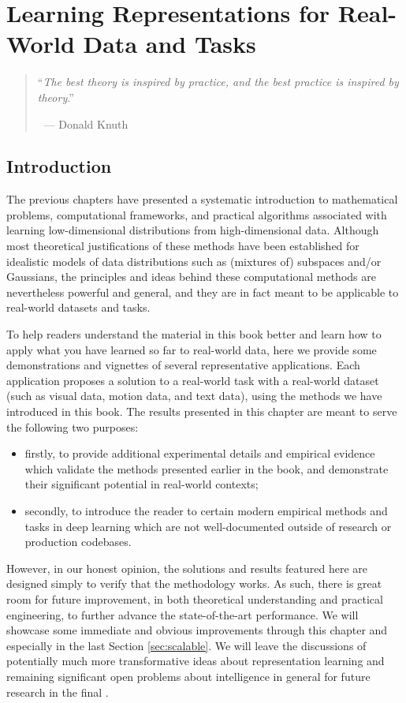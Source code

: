 \documentclass[../../book-main.tex]{subfiles}
\begin{document}
\chapter{Learning Representations for Real-World Data and Tasks}
\label{ch:applications}

\begin{quote}
    \hfill    ``{\em The best theory is inspired by practice, and the
    best practice is inspired by theory}.''

    $~$ \hfill --- Donald Knuth
\end{quote}
\vspace{5mm}

\section{Introduction}
The previous chapters have presented a systematic introduction to
mathematical problems, computational frameworks, and practical
algorithms associated with learning low-dimensional distributions
from high-dimensional data. Although most theoretical justifications
of these methods have been established for idealistic models of data
distributions such as (mixtures of) subspaces and/or Gaussians, the
principles and ideas behind these computational methods are
nevertheless powerful and general, and they are in fact meant to be
applicable to real-world datasets and tasks.

To help readers understand the material in this book better and learn
how to apply what you have learned so far to real-world data, here we
provide some demonstrations and vignettes of
several representative applications. Each application proposes a
solution to a real-world task with a real-world dataset (such as
visual data, motion data, and text data), using the methods we have
introduced in this book. The results presented in this chapter are
meant to serve the following two purposes:
\begin{itemize}
    \item firstly, to provide additional experimental details and
        empirical evidence which validate the methods presented
        earlier in the book, and demonstrate their significant
        potential in real-world contexts;
    \item secondly, to introduce the reader to certain modern
        empirical methods and tasks in deep learning which are not
        well-documented outside of research or production codebases.
\end{itemize}
However, in our honest opinion, the solutions and results featured
here are designed simply to verify that the methodology works. As
such, there is great room for future improvement, in both theoretical
understanding and practical
engineering, to further advance the
state-of-the-art performance. We will showcase some immediate and
obvious improvements through this chapter and especially in the last
Section \ref{sec:scalable}. We will leave the discussions of
potentially much more transformative ideas about representation
learning and remaining significant open problems about intelligence
in general for
future research in the final  .
\end{document}
